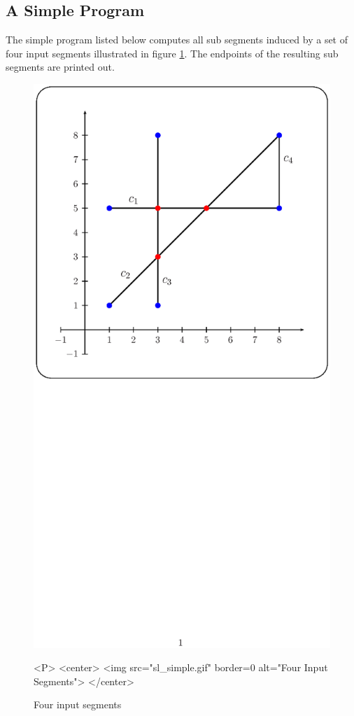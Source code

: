 \subsection{A Simple Program}
The simple program listed below computes all sub segments induced by 
a set of four input segments illustrated in figure \ref{SL_sec:simple}.
The endpoints of the resulting sub segments are printed out.

\begin{figure}[hbp]
\begin{ccTexOnly}
\centerline{\includegraphics{Sweep_line_2/sl_simple.ps}}
\end{ccTexOnly}

\caption{Four input segments
\label{SL_sec:simple}}

\begin{ccHtmlOnly}
<P>
<center>
  <img src="sl_simple.gif" border=0 alt="Four Input Segments">
</center>
\end{ccHtmlOnly}
\end{figure}

